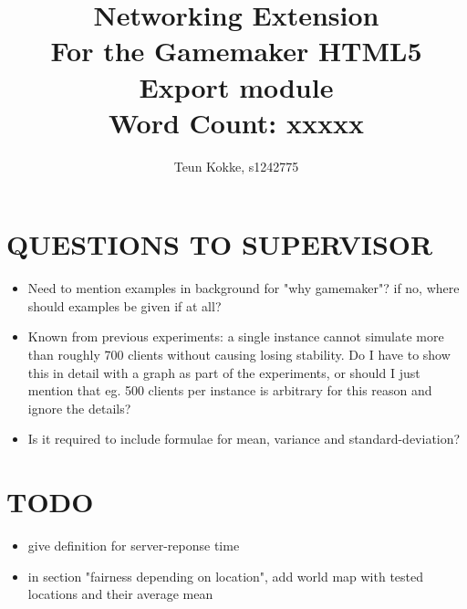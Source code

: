 \documentclass[12pt]{article}
\begin{document}
\author{Teun Kokke, s1242775}
\title
{
	\vspace*{\dimexpr-1.4in-\topmargin-\headsep-\headheight-\baselineskip}%
	\hspace*{\dimexpr-1.2in-\evensidemargin-\parindent}%
    Networking Extension\\
    {\small For the Gamemaker HTML5 Export module\\Word Count: xxxxx}
    \vspace{18em}
}

\begin{titlepage}
\maketitle
\end{titlepage}

\section*{QUESTIONS TO SUPERVISOR}
\begin{itemize}
\item Need to mention examples in background for "why gamemaker"? if no, where should examples be given if at all?
\item Known from previous experiments: a single instance cannot simulate more than roughly 700 clients without causing losing stability. Do I have to show this in detail with a graph as part of the experiments, or should I just mention that eg. 500 clients per instance is arbitrary for this reason and ignore the details?
\item Is it required to include formulae for mean, variance and standard-deviation?
\end{itemize}

\section*{TODO}
\begin{itemize}
\item give definition for server-reponse time
\item in section "fairness depending on location", add world map with tested locations and their average mean
\end{itemize}
\end{document}
